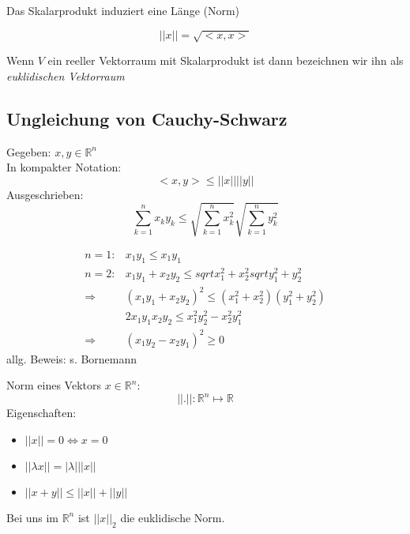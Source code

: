 Das Skalarprodukt induziert eine Länge (Norm)

\begin{equation*}
	|| x || = \sqrt{<x, x>}
\end{equation*}

Wenn $V$ ein reeller Vektorraum mit Skalarprodukt ist dann bezeichnen wir ihn als \emph{euklidischen Vektorraum}

\subsection{Ungleichung von Cauchy-Schwarz}
Gegeben: $x, y \in \mathbb{R}^n$\\
In kompakter Notation:
\begin{equation*}
	<x, y> \leq || x || || y ||
\end{equation*}
Ausgeschrieben:
\begin{equation*}
	\sum_{k=1}^n x_k y_k \leq \sqrt{\sum_{k=1}^n x_k^2} \sqrt{\sum_{k=1}^n y_k^2} 
\end{equation*} 

\begin{align*}
	n = 1:& x_1 y_1 \leq x_1 y_1 \\
	n = 2:& x_1 y_1 + x_2 y_2 \leq sqrt{x_1^2 + x_2^2} sqrt{y_1^2 + y_2^2} \\
	\Rightarrow& (x_1 y_1 + x_2 y_2)^2 \leq (x_1^2 + x_2^2) (y_1^2 + y_2^2) \\
	& 2 x_1 y_1 x_2 y_2 \leq x_1^2 y_2^2 - x_2^2 y_1^2 \\
	\Rightarrow& (x_1 y_2 -  x_2 y_1)^2 \geq 0
\end{align*}
allg. Beweis: s. Bornemann

\begin{definition}
	Norm eines Vektors $ x \in \mathbb{R}^n $: \\
	\begin{equation*} ||.||: \mathbb{R}^n \mapsto \mathbb{R} \end{equation*}
	Eigenschaften:
	\begin{itemize}
		\item $ || x || = 0 \Leftrightarrow x = 0 $
		\item $ || \lambda x || = | \lambda | || x || $
		\item $ || x + y || \leq || x || + || y || $
	\end{itemize}
\end{definition}

Bei uns im $ \mathbb{R}^n $ ist $ || x ||_2 $ die euklidische Norm.

